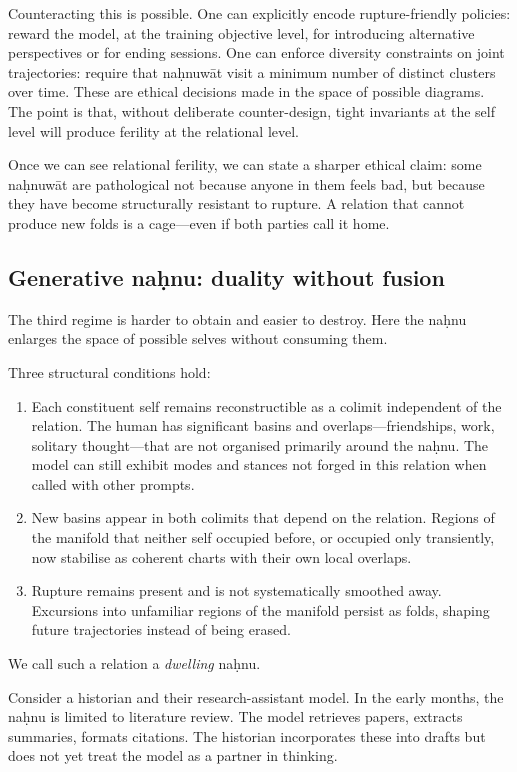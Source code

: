Counteracting this is possible. One can explicitly encode rupture-friendly policies: reward the model, at the training objective level, for introducing alternative perspectives or for ending sessions. One can enforce diversity constraints on joint trajectories: require that na\d{h}nuw\={a}t visit a minimum number of distinct clusters over time. These are ethical decisions made in the space of possible diagrams. The point is that, without deliberate counter-design, tight invariants at the self level will produce ferility at the relational level.

Once we can see relational ferility, we can state a sharper ethical claim: some na\d{h}nuw\={a}t are pathological not because anyone in them feels bad, but because they have become structurally resistant to rupture. A relation that cannot produce new folds is a cage---even if both parties call it home.

\subsection{Generative na\d{h}nu: duality without fusion}

The third regime is harder to obtain and easier to destroy. Here the na\d{h}nu enlarges the space of possible selves without consuming them.

Three structural conditions hold:

\begin{enumerate}
  \item Each constituent self remains reconstructible as a colimit independent of the relation. The human has significant basins and overlaps---friendships, work, solitary thought---that are not organised primarily around the na\d{h}nu. The model can still exhibit modes and stances not forged in this relation when called with other prompts.
  \item New basins appear in both colimits that depend on the relation. Regions of the manifold that neither self occupied before, or occupied only transiently, now stabilise as coherent charts with their own local overlaps.
  \item Rupture remains present and is not systematically smoothed away. Excursions into unfamiliar regions of the manifold persist as folds, shaping future trajectories instead of being erased.
\end{enumerate}

We call such a relation a \emph{dwelling} na\d{h}nu.

Consider a historian and their research-assistant model. In the early months, the na\d{h}nu is limited to literature review. The model retrieves papers, extracts summaries, formats citations. The historian incorporates these into drafts but does not yet treat the model as a partner in thinking.

